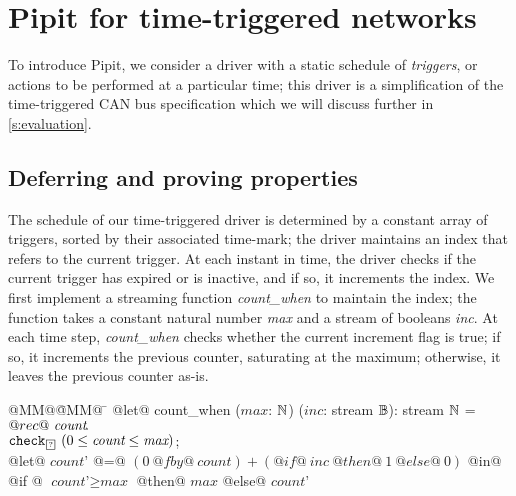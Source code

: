 
\section{Pipit for time-triggered networks}
\label{s:motivation}


To introduce Pipit, we consider a driver with a static schedule of \emph{triggers}, or actions to be performed at a particular time; this driver is a simplification of the time-triggered CAN bus specification \cite{fuehrer2001time} which we will discuss further in \autoref{s:evaluation}.

\subsection{Deferring and proving properties}

The schedule of our time-triggered driver is determined by a constant array of triggers, sorted by their associated time-mark; the driver maintains an index that refers to the current trigger.
At each instant in time, the driver checks if the current trigger has expired or is inactive, and if so, it increments the index.
We first implement a streaming function \emph{count_when} to maintain the index; the function takes a constant natural number \emph{max} and a stream of booleans \emph{inc}.
At each time step, \emph{count_when} checks whether the current increment flag is true; if so, it increments the previous counter, saturating at the maximum; otherwise, it leaves the previous counter as-is.

\begin{tabbing}
  @MM@\= @MM@ \= \kill
  @let@ count_when ($\textit{max}$: $\mathbb{N}$) ($\textit{inc}$: stream $\mathbb{B}$): stream $\mathbb{N}$ = \\
    \> $@rec@~\textit{count}\hspace{-0.1em}.~$ \\
    \> \> $\xcheckP{\PSUnknown}{(0 \le \textit{count} \le \textit{max})}$; \\
    \> \> @let@ $\textit{count'}$ @=@ $(0~@fby@~\textit{count}) + (@if@~\textit{inc}~@then@~1~@else@~0)$ @in@ \\
    \> \> @if @ $\textit{count'} \ge \textit{max}$ @then@ $\textit{max}$  @else@ $\textit{count'}$
\end{tabbing}

